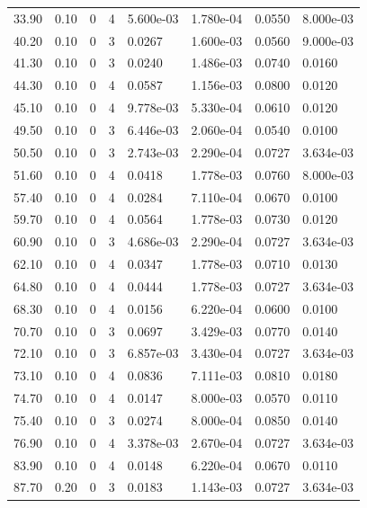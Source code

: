 \documentclass[preview]{standalone}
\begin{document}
{{\begin{tabular}{L{1.2cm}C{1.2cm} C{0.3cm}C{0.5cm} C{1.4cm}C{1.4cm} C{1.4cm}C{1.4cm}}
  33.90  &  0.10  & 0     &  4 &  5.600e-03  & 1.780e-04  & 0.0550 &  8.000e-03   \\ 
  40.20  &  0.10  & 0     &  3 &  0.0267  & 1.600e-03  & 0.0560 &  9.000e-03   \\ 
  41.30  &  0.10  & 0     &  3 &  0.0240  & 1.486e-03  & 0.0740 &  0.0160   \\ 
  44.30  &  0.10  & 0     &  4 &  0.0587  & 1.156e-03  & 0.0800 &  0.0120   \\ 
  45.10  &  0.10  & 0     &  4 &  9.778e-03  & 5.330e-04  & 0.0610 &  0.0120   \\ 
  49.50  &  0.10  & 0     &  3 &  6.446e-03  & 2.060e-04  & 0.0540 &  0.0100   \\ 
  50.50  &  0.10  & 0     &  3 &  2.743e-03  & 2.290e-04  & 0.0727 &  3.634e-03   \\ 
  51.60  &  0.10  & 0     &  4 &  0.0418  & 1.778e-03  & 0.0760 &  8.000e-03   \\ 
  57.40  &  0.10  & 0     &  4 &  0.0284  & 7.110e-04  & 0.0670 &  0.0100   \\ 
  59.70  &  0.10  & 0     &  4 &  0.0564  & 1.778e-03  & 0.0730 &  0.0120   \\ 
  60.90  &  0.10  & 0     &  3 &  4.686e-03  & 2.290e-04  & 0.0727 &  3.634e-03   \\ 
  62.10  &  0.10  & 0     &  4 &  0.0347  & 1.778e-03  & 0.0710 &  0.0130   \\ 
  64.80  &  0.10  & 0     &  4 &  0.0444  & 1.778e-03  & 0.0727 &  3.634e-03   \\ 
  68.30  &  0.10  & 0     &  4 &  0.0156  & 6.220e-04  & 0.0600 &  0.0100   \\ 
  70.70  &  0.10  & 0     &  3 &  0.0697  & 3.429e-03  & 0.0770 &  0.0140   \\ 
  72.10  &  0.10  & 0     &  3 &  6.857e-03  & 3.430e-04  & 0.0727 &  3.634e-03   \\ 
  73.10  &  0.10  & 0     &  4 &  0.0836  & 7.111e-03  & 0.0810 &  0.0180   \\ 
  74.70  &  0.10  & 0     &  4 &  0.0147  & 8.000e-03  & 0.0570 &  0.0110   \\ 
  75.40  &  0.10  & 0     &  3 &  0.0274  & 8.000e-04  & 0.0850 &  0.0140   \\ 
  76.90  &  0.10  & 0     &  4 &  3.378e-03  & 2.670e-04  & 0.0727 &  3.634e-03   \\ 
  83.90  &  0.10  & 0     &  4 &  0.0148  & 6.220e-04  & 0.0670 &  0.0110   \\ 
  87.70  &  0.20  & 0     &  3 &  0.0183  & 1.143e-03  & 0.0727 &  3.634e-03   \\ 

\end{tabular}}}
\end{document}
